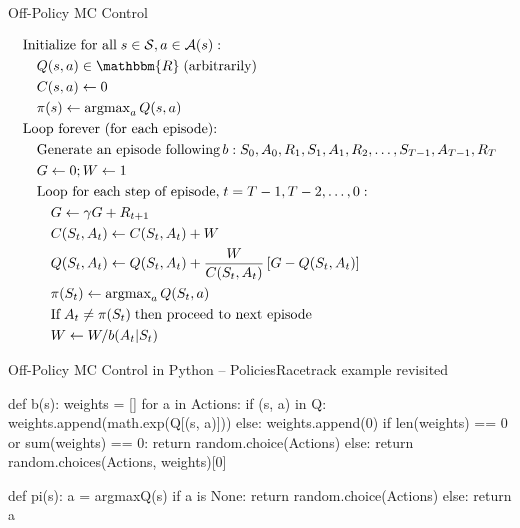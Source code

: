 \documentclass[ignorenonframetext,xcolor=x11names]{beamer}
\begin{document}
 

\begin{frame}{Off-Policy MC Control}
\begin{block}{}
\footnotesize
\begin{align*}
& \text{Initialize for all}\; s \in \mathcal{S}, a \in \mathcal{A}(s):\\
& \quad Q(s,a) \in \mathbbm{R}\; \text{(arbitrarily)} \\
& \quad C(s, a) \leftarrow 0 \\
& \quad \pi(s) \leftarrow \operatorname{arg max}_a Q(s, a) \\
& \text{Loop forever (for each episode):} \\
& \quad \text{Generate an episode following}\, b: S_0, A_0, R_1, S_1, A_1, R_2, \ldots, S_{T-1}, A_{T-1}, R_{T} \\
& \quad G \leftarrow 0; W \leftarrow 1 \\
& \quad \text{Loop for each step of episode,}\; t = T-1, T-2, \ldots, 0: \\
& \quad \quad G \leftarrow \gamma G + R_{t+1} \\
& \quad \quad C(S_t, A_t) \leftarrow C(S_t, A_t) + W \\
& \quad \quad Q(S_t, A_t) \leftarrow Q(S_t, A_t) + \frac{W}{C(S_t, A_t)} \left[ G - Q(S_t, A_t) \right] \\
& \quad \quad \pi(S_t) \leftarrow \operatorname{arg max}_a Q(S_t, a) \\
& \quad \quad \text{If}\; A_t \neq \pi(S_t) \; \text{then proceed to next episode} \\
& \quad \quad W \leftarrow W / b(A_t | S_t)
\end{align*}
\end{block}
\end{frame}

\begin{frame}[fragile]{Off-Policy MC Control in Python -- Policies}{Racetrack example revisited}
\begin{pythoncode}
def b(s):
    weights = []
    for a in Actions:
        if (s, a) in Q:
            weights.append(math.exp(Q[(s, a)]))
        else:
            weights.append(0)
    if len(weights) == 0 or sum(weights) == 0:
        return random.choice(Actions)
    else:
        return random.choices(Actions, weights)[0]

def pi(s):
    a = argmaxQ(s)
    if a is None:
        return random.choice(Actions)
    else:
        return a
\end{pythoncode}
\end{frame}
\end{document}
